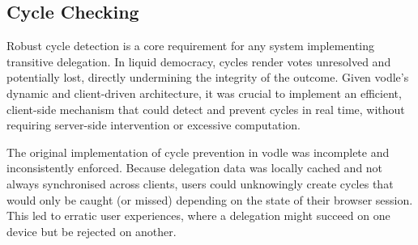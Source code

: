 


\subsection{Cycle Checking}
Robust cycle detection is a core requirement for any system implementing transitive delegation. In liquid democracy, cycles render votes unresolved and potentially lost, directly undermining the integrity of the outcome. Given vodle's dynamic and client-driven architecture, it was crucial to implement an efficient, client-side mechanism that could detect and prevent cycles in real time, without requiring server-side intervention or excessive computation.

The original implementation of cycle prevention in vodle was incomplete and inconsistently enforced. Because delegation data was locally cached and not always synchronised across clients, users could unknowingly create cycles that would only be caught (or missed) depending on the state of their browser session. This led to erratic user experiences, where a delegation might succeed on one device but be rejected on another.

